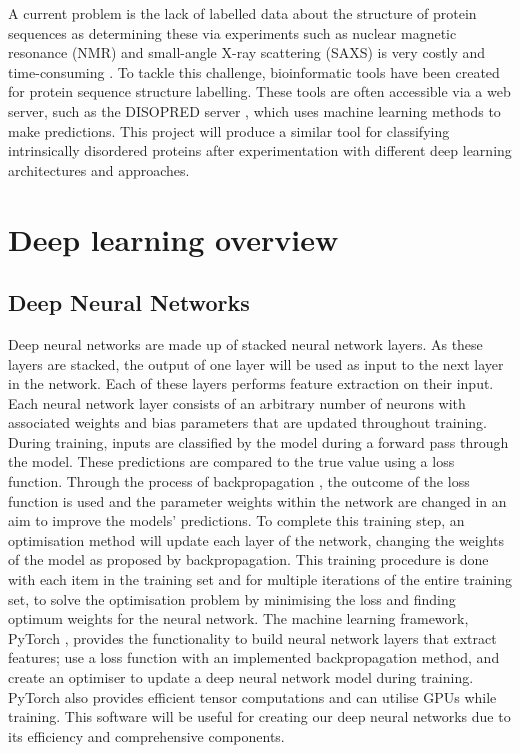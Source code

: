 \documentclass{l4proj}
\begin{document}
A current problem is the lack of labelled data about the structure of protein sequences as determining these via experiments such as nuclear magnetic resonance (NMR) and small-angle X-ray scattering (SAXS) is very costly and time-consuming \citep{Alshehri:20}. To tackle this challenge, bioinformatic tools have been created for protein sequence structure labelling. These tools are often accessible via a web server, such as the DISOPRED server \citep{Jones:15}, which uses machine learning methods to make predictions. This project will produce a similar tool for classifying intrinsically disordered proteins after experimentation with different deep learning architectures and approaches.

\section{Deep learning overview}

\subsection{Deep Neural Networks}

Deep neural networks are made up of stacked neural network layers. As these layers are stacked, the output of one layer will be used as input to the next layer in the network. Each of these layers performs feature extraction on their input. Each neural network layer consists of an arbitrary number of neurons with associated weights and bias parameters that are updated throughout training. During training, inputs are classified by the model during a forward pass through the model. These predictions are compared to the true value using a loss function. Through the process of backpropagation \citep{Goodfellow-et-al-2016}, the outcome of the loss function is used and the parameter weights within the network are changed in an aim to improve the models' predictions. To complete this training step, an optimisation method will update each layer of the network, changing the weights of the model as proposed by backpropagation. This training procedure is done with each item in the training set and for multiple iterations of the entire training set, to solve the optimisation problem by minimising the loss and finding optimum weights for the neural network. The machine learning framework, PyTorch \citep{pytorch}, provides the functionality to build neural network layers that extract features; use a loss function with an implemented backpropagation method, and create an optimiser to update a deep neural network model during training. PyTorch also provides efficient tensor computations and can utilise GPUs while training. This software will be useful for creating our deep neural networks due to its efficiency and comprehensive components.
\end{document}
